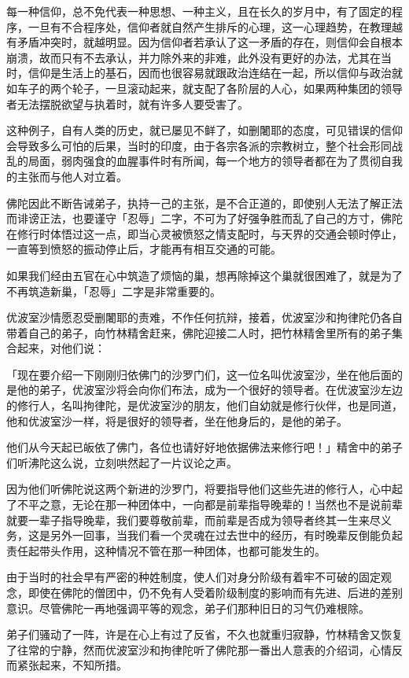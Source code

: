 \documentclass[12pt,twoside,openany]{book}
\begin{document}
每一种信仰，总不免代表一种思想、一种主义，且在长久的岁月中，有了固定的程序，一旦有不合程序处，信仰者就自然产生排斥的心理，这一心理趋势，在教理越有矛盾冲突时，就越明显。因为信仰者若承认了这一矛盾的存在，则信仰会自根本崩溃，故而只有不去承认，并力除外来的非难，此外没有更好的办法，尤其在当时，信仰是生活上的基石，因而也很容易就跟政治连结在一起，所以信仰与政治就如车子的两个轮子，一旦滚动起来，就支配了各阶层的人心，如果两种集团的领导者无法摆脱欲望与执着时，就有许多人要受害了。

这种例子，自有人类的历史，就已屡见不鲜了，如删闍耶的态度，可见错误的信仰会导致多么可怕的后果，当时的印度，由于各宗各派的宗教树立，整个社会形同战乱的局面，弱肉强食的血腥事件时有所闻，每一个地方的领导者都在为了贯彻自我的主张而与他人对立着。

佛陀因此不断告诫弟子，执持一己的主张，是不合正道的，即使别人无法了解正法而诽谤正法，也要谨守「忍辱」二字，不可为了好强争胜而乱了自己的方寸，佛陀在修行时体悟过这一点，即当心灵被愤怒之情支配时，与天界的交通会顿时停止，一直等到愤怒的振动停止后，才能再有相互交通的可能。

如果我们经由五官在心中筑造了烦恼的巢，想再除掉这个巢就很困难了，就是为了不再筑造新巢，「忍辱」二字是非常重要的。

优波室沙情愿忍受删闍耶的责难，不作任何抗辩，接着，优波室沙和拘律陀仍各自带着自己的弟子，向竹林精舍赶来，佛陀迎接二人时，把竹林精舍里所有的弟子集合起来，对他们说：

「现在要介绍一下刚刚归依佛门的沙罗门们，这一位名叫优波室沙，坐在他后面的是他的弟子，优波室沙将会向你们布法，成为一个很好的领导者。在优波室沙左边的修行人，名叫拘律陀，是优波室沙的朋友，他们自幼就是修行伙伴，也是同道，他和优波室沙一样，将是很好的领导者，坐在他身后的，是他的弟子。

他们从今天起已皈依了佛门，各位也请好好地依据佛法来修行吧！」精舍中的弟子们听沸陀这么说，立刻哄然起了一片议论之声。

因为他们听佛陀说这两个新进的沙罗门，将要指导他们这些先进的修行人，心中起了不平之意，无论在那一种团体中，一向都是前辈指导晚辈的！当然也不是说前辈就要一辈子指导晚辈，我们要尊敬前辈，而前辈是否成为领导者终其一生来尽义务，这是另外一回事，当我们看一个灵魂在过去世中的经历，有时晚辈反倒能负起责任起带头作用，这种情况不管在那一种团体，也都可能发生的。

由于当时的社会早有严密的种姓制度，使人们对身分阶级有着牢不可破的固定观念，即使在佛陀的僧团中，仍不免有人受着阶级制度的影响而有先进、后进的差别意识。尽管佛陀一再地强调平等的观念，弟子们那种旧日的习气仍难根除。

弟子们骚动了一阵，许是在心上有过了反省，不久也就重归寂静，竹林精舍又恢复了往常的宁静，然而优波室沙和拘律陀听了佛陀那一番出人意表的介绍词，心情反而紧张起来，不知所措。
\end{document}
